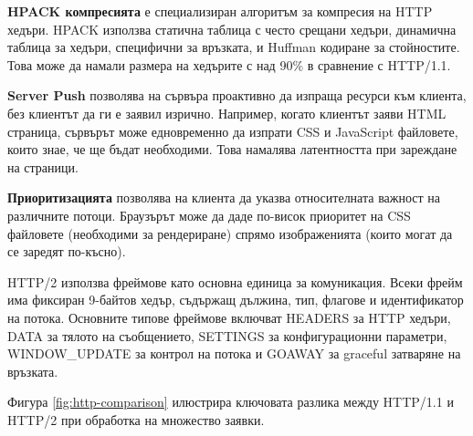 \textbf{HPACK компресията} \cite{rfc7541} е специализиран алгоритъм за компресия на HTTP хедъри. HPACK използва статична таблица с често срещани хедъри, динамична таблица за хедъри, специфични за връзката, и Huffman кодиране за стойностите. Това може да намали размера на хедърите с над 90\% в сравнение с HTTP/1.1.

\textbf{Server Push} позволява на сървъра проактивно да изпраща ресурси към клиента, без клиентът да ги е заявил изрично. Например, когато клиентът заяви HTML страница, сървърът може едновременно да изпрати CSS и JavaScript файловете, които знае, че ще бъдат необходими. Това намалява латентността при зареждане на страници.

\textbf{Приоритизацията} позволява на клиента да указва относителната важност на различните потоци. Браузърът може да даде по-висок приоритет на CSS файловете (необходими за рендериране) спрямо изображенията (които могат да се заредят по-късно).

HTTP/2 използва фреймове като основна единица за комуникация. Всеки фрейм има фиксиран 9-байтов хедър, съдържащ дължина, тип, флагове и идентификатор на потока. Основните типове фреймове включват HEADERS за HTTP хедъри, DATA за тялото на съобщението, SETTINGS за конфигурационни параметри, WINDOW\_UPDATE за контрол на потока и GOAWAY за graceful затваряне на връзката.

Фигура \ref{fig:http-comparison} илюстрира ключовата разлика между HTTP/1.1 и HTTP/2 при обработка на множество заявки.

